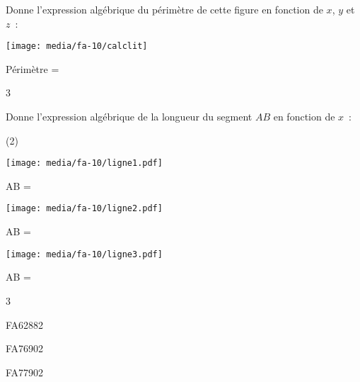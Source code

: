 \documentclass[a4paper,11pt]{report}
\begin{document}
\begin{exop}{ Donne l'expression algébrique du périmètre de cette figure en fonction de $x$, $y$ et $z$~:


\begin{center}
    
     \texttt{[image: media/fa-10/calclit]}
\end{center}


Périmètre = \hrulefill
  
}
{3}
\end{exop}

\begin{exop}{ Donne l'expression algébrique de la longueur du segment $AB$ en fonction de $x$~:

\begin{tasks}(2)
    \task 
    
    \texttt{[image: media/fa-10/ligne1.pdf]}

AB = \hrulefill
  \task 
  
     \texttt{[image: media/fa-10/ligne2.pdf]}

AB = \hrulefill

  \task 
  
     \texttt{[image: media/fa-10/ligne3.pdf]}

AB = \hrulefill

\end{tasks}
}
{3}
\end{exop}

\begin{exol}{FA62}{88}{2}
\end{exol}

\begin{exol}{FA76}{90}{2}
\end{exol}

\begin{exol}{FA77}{90}{2}
\end{exol}
\end{document}
